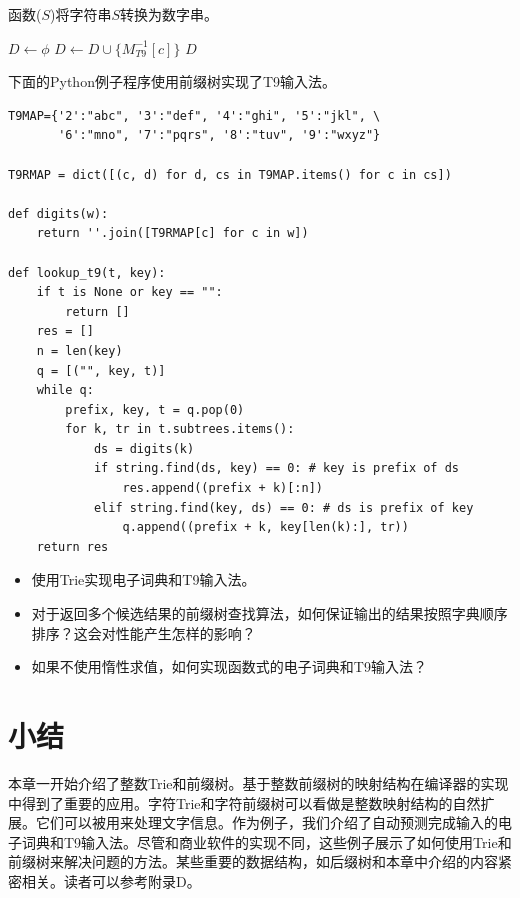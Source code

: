 \documentclass[b5paper]{ctexart}
\begin{document}
函数($S$)将字符串$S$转换为数字串。

\begin{algorithmic}[1]
  \State $D \gets \phi$
    \State $D \gets D \cup \{M^{-1}_{T9}[c]\}$
  \EndFor
  \State \Return $D$
\EndFunction
\end{algorithmic}

下面的Python例子程序使用前缀树实现了T9输入法。

\lstset{language=Python}
\begin{lstlisting}
T9MAP={'2':"abc", '3':"def", '4':"ghi", '5':"jkl", \
       '6':"mno", '7':"pqrs", '8':"tuv", '9':"wxyz"}

T9RMAP = dict([(c, d) for d, cs in T9MAP.items() for c in cs])

def digits(w):
    return ''.join([T9RMAP[c] for c in w])

def lookup_t9(t, key):
    if t is None or key == "":
        return []
    res = []
    n = len(key)
    q = [("", key, t)]
    while q:
        prefix, key, t = q.pop(0)
        for k, tr in t.subtrees.items():
            ds = digits(k)
            if string.find(ds, key) == 0: # key is prefix of ds
                res.append((prefix + k)[:n])
            elif string.find(key, ds) == 0: # ds is prefix of key
                q.append((prefix + k, key[len(k):], tr))
    return res
\end{lstlisting}

\begin{Exercise}
\begin{itemize}
\item 使用Trie实现电子词典和T9输入法。
\item 对于返回多个候选结果的前缀树查找算法，如何保证输出的结果按照字典顺序排序？这会对性能产生怎样的影响？
\item 如果不使用惰性求值，如何实现函数式的电子词典和T9输入法？
\end{itemize}
\end{Exercise}

\section{小结}

本章一开始介绍了整数Trie和前缀树。基于整数前缀树的映射结构在编译器的实现中得到了重要的应用。字符Trie和字符前缀树可以看做是整数映射结构的自然扩展。它们可以被用来处理文字信息。作为例子，我们介绍了自动预测完成输入的电子词典和T9输入法。尽管和商业软件的实现不同，这些例子展示了如何使用Trie和前缀树来解决问题的方法。某些重要的数据结构，如后缀树和本章中介绍的内容紧密相关。读者可以参考附录D。
\end{document}
